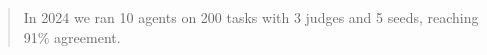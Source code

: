 \documentclass{article}
\begin{document}
\begin{abstract}
In 2024 we ran 10 agents on 200 tasks with 3 judges and 5 seeds, reaching 91\% agreement.
\end{abstract}

\end{document}
